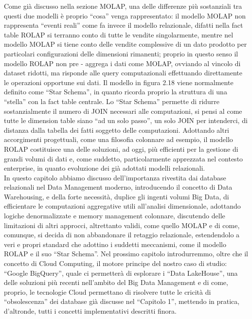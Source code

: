 \documentclass[a4paper,12pt]{report}
\begin{document}
Come già discusso nella sezione MOLAP, una delle differenze più sostanziali tra questi due modelli è proprio “cosa” venga rappresentato: il modello MOLAP non rappresenta “eventi reali” come fa invece il modello relazionale, difatti nella fact table ROLAP si terranno conto di tutte le vendite singolarmente, mentre nel modello MOLAP si tiene conto delle vendite complessive di un dato prodotto per particolari configurazioni delle dimensioni rimanenti; proprio in questo senso il modello ROLAP non pre - aggrega i dati come MOLAP, ovviando al vincolo di dataset ridotti, ma risponde alle query computazionali effettuando direttamente le operazioni opportune sui dati. Il modello in figura 2.18 viene normalmente definito come “Star Schema”, in quanto ricorda proprio la struttura di una “stella” con la fact table centrale. Lo “Star Schema” permette di ridurre sostanzialmente il numero di JOIN necessari alle computazioni, si pensi al come tutte le dimension table siano “ad un solo passo”, un solo JOIN per intenderci, di distanza dalla tabella dei fatti soggetto delle computazioni. Adottando altri accorgimenti progettuali, come una filosofia colonnare ad esempio, il modello ROLAP costituisce una delle soluzioni, ad oggi, più efficienti per la gestione di grandi volumi di dati e, come suddetto, particolarmente apprezzata nel contesto enterprise, in quanto evoluzione dei già adottati modelli relazionali. 
\noindent
\\[1ex]
In questo capitolo abbiamo discusso dell’importanza rivestita dai database relazionali nel Data Management moderno, introducendo il concetto di Data Warehousing, e della forte necessità, duplice gli ingenti volumi Big Data, di efficientare le computazioni aggregative utili all’analisi dimensionale, adottando logiche denormalizzate e memory management colonnare, discutendo delle limitazioni di altri approcci, altrettanto validi, come quello MOLAP e di come, comunque, si decida di non abbandonare il retaggio relazionale, estendendolo a veri e propri standard che adottino i suddetti meccanismi, come il modello ROLAP e il suo “Star Schema”. Nel prossimo capitolo introdurremmo, oltre che il concetto di Cloud Computing, il motore principe del nostro caso di studio: “Google BigQuery”, quale ci permetterà di esplorare i “Data LakeHouse”, una delle soluzioni più recenti nell’ambito del Big Data Management e di come, proprio, le tecnologie Cloud permettano di risolvere tutte le cricità di “obsolescenza” dei database già discusse nel “Capitolo 1”, mettendo in pratica, d’altronde, tutti i concetti implementativi descritti finora.
\end{document}
